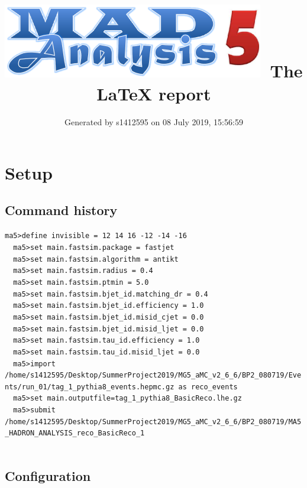 \documentclass[a4paper, 10pt]{article}
\title{{\includegraphics[scale=.4]{logo.png}}\ The LaTeX report}
\author{Generated by s1412595 on 08 July 2019, 15:56:59}
\begin{document}
\maketitle
\flushbottom

\newpage
\section{ Setup}

\subsection{ Command history}

\texttt{ma5>define invisible = 12 14 16 -12 -14 -16\\
}
\texttt{ }\texttt{ }\texttt{ma5>set main.fastsim.package = fastjet\\
}
\texttt{ }\texttt{ }\texttt{ma5>set main.fastsim.algorithm = antikt\\
}
\texttt{ }\texttt{ }\texttt{ma5>set main.fastsim.radius = 0.4\\
}
\texttt{ }\texttt{ }\texttt{ma5>set main.fastsim.ptmin = 5.0\\
}
\texttt{ }\texttt{ }\texttt{ma5>set main.fastsim.bjet\_id.matching\_dr = 0.4\\
}
\texttt{ }\texttt{ }\texttt{ma5>set main.fastsim.bjet\_id.efficiency = 1.0\\
}
\texttt{ }\texttt{ }\texttt{ma5>set main.fastsim.bjet\_id.misid\_cjet = 0.0\\
}
\texttt{ }\texttt{ }\texttt{ma5>set main.fastsim.bjet\_id.misid\_ljet = 0.0\\
}
\texttt{ }\texttt{ }\texttt{ma5>set main.fastsim.tau\_id.efficiency = 1.0\\
}
\texttt{ }\texttt{ }\texttt{ma5>set main.fastsim.tau\_id.misid\_ljet = 0.0\\
}
\texttt{ }\texttt{ }\texttt{ma5>import /\-home/\-s1412595/\-Desktop/\-SummerProject2019/\-MG5\_aMC\_v2\_6\_6/\-BP2\_080719/\-Events/\-run\_01/\-tag\_1\_pythia8\_events.hepmc.gz as reco\_events\\
}
\texttt{ }\texttt{ }\texttt{ma5>set main.outputfile=tag\_1\_pythia8\_BasicReco.lhe.gz\\
}
\texttt{ }\texttt{ }\texttt{ma5>submit /\-home/\-s1412595/\-Desktop/\-SummerProject2019/\-MG5\_aMC\_v2\_6\_6/\-BP2\_080719/\-MA5\_HADRON\_ANALYSIS\_reco\_BasicReco\_1\\
}
\texttt{ }\texttt{ }\subsection{ Configuration}
\end{document}
